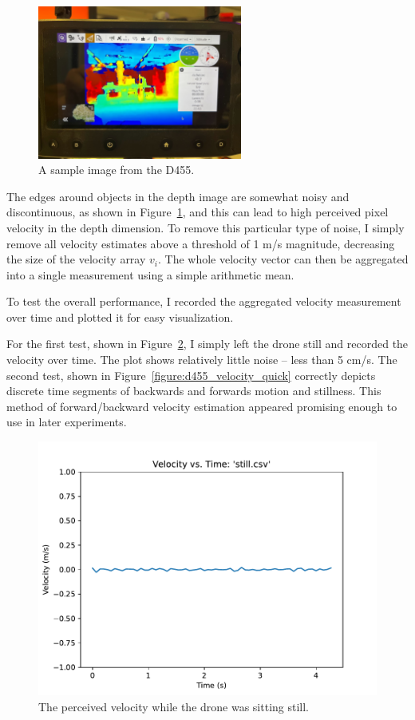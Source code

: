 \begin{figure}[ht]
	\centering
	\includegraphics[width=0.6\textwidth]{./images/d455_sample.jpg}
	\caption{A sample image from the D455.}
	\label{figure:d455_sample}
\end{figure}
The edges around objects in the depth image are somewhat noisy and discontinuous,
as shown in Figure~\ref{figure:d455_sample},
and this can lead to high perceived pixel velocity in the depth dimension.
To remove this particular type of noise, I simply remove all velocity estimates
above a threshold of 1 m/s magnitude, decreasing the size of the velocity array $v_i$.
The whole velocity vector can then be aggregated into a single measurement using a simple arithmetic mean.

To test the overall performance, I recorded the aggregated velocity measurement over time
and plotted it for easy visualization.

For the first test, shown in Figure~\ref{figure:d455_velocity_still},
I simply left the drone still and recorded the velocity over time.
The plot shows relatively little noise -- less than 5 cm/s.
The second test, shown in Figure~\ref{figure:d455_velocity_quick} correctly depicts
discrete time segments of backwards and forwards motion and stillness.
This method of forward/backward velocity estimation appeared promising enough to use in later experiments.

\begin{figure}
	\centering
	\includegraphics[width=\linewidth]{./images/still.pdf}
	\caption{The perceived velocity while the drone was sitting still.}
	\label{figure:d455_velocity_still}
\end{figure}

